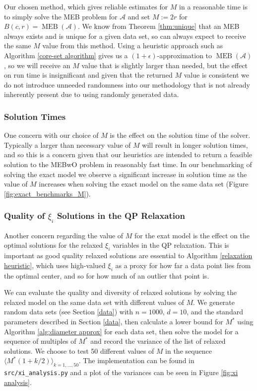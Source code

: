 \documentclass[11pt,twoside]{report}
\newcommand{\A}{\mathcal{A}} %
\DeclareMathOperator{\MEB}{MEB}
\theoremstyle{definition}
\numberwithin{theorem}{section}
\numberwithin{definition}{section}
\numberwithin{lemma}{section}
\numberwithin{proposition}{section}
\numberwithin{equation}{section}
\numberwithin{figure}{section}
\begin{document}
Our chosen method, which gives reliable estimates for $M$ in a reasonable time is to simply solve the MEB problem for $\A$ and set $M:=2r$ for $B(c,r)=\MEB(\A)$. We know from Theorem \ref{thm:unique} that an MEB always exists and is unique for a given data set, so can always expect to receive the same $M$ value from this method. Using a heuristic approach such as Algorithm \ref{core-set algorithm} gives us a $(1+\epsilon)$-approximation to $\MEB(\A)$, so we will receive an $M$ value that is slightly larger than needed, but the effect on run time is insignificant and given that the returned $M$ value is consistent we do not introduce unneeded randomness into our methodology that is not already inherently present due to using randomly generated data.

\subsubsection{Solution Times}
One concern with our choice of $M$ is the effect on the solution time of the solver. Typically a larger than necessary value of $M$ will result in longer solution times, and so this is a concern given that our heuristics are intended to return a feasible solution to the MEBwO problem in reasonably fast time. In our benchmarking of solving the exact model we observe a significant increase in solution time as the value of $M$ increases when solving the exact model on the same data set (Figure \ref{fig:exact_benchmarks_M}). 

\subsubsection{Quality of $\xi_i$ Solutions in the QP Relaxation}
Another concern regarding the value of $M$ for the exat model is the effect on the optimal solutions for the relaxed $\xi_i$ variables in the QP relaxation. This is important as good quality relaxed solutions are essential to Algorithm \ref{relaxation heuristic}, which uses high-valued $\xi_i$ as a proxy for how far a data point lies from the optimal center, and so for how much of an outlier that point is.

We can evaluate the quality and diversity of relaxed solutions by solving the relaxed model on the same data set with different values of $M$. We generate random data sets (see Section \ref{data}) with $n=1000$, $d=10$, and the standard parameters described in Section \ref{data}, then calculate a lower bound for $M^*$ using Algorithm \ref{alg:diameter approx} for each data set, then solve the model for a sequence of multiples of $M^*$ and record the variance of the list of relaxed solutions. We choose to test 50 different values of $M$ in the sequence $\langle M^*(1+k/2)\rangle _{k=1,\ldots,50}$. The implementation can be found in \texttt{src/xi\_analysis.py} and a plot of the variances can be seen in Figure \ref{fig:xi analysis}.
\end{document}
